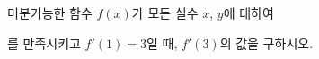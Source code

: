 미분가능한 함수 $f(x)$가 모든 실수 $x$, $y$에 대하여 \par\smallskip{}\par\smallskip\noindent 를 만족시키고 $f'(1)=3$일 때, $f'(3)$의 값을 구하시오.
